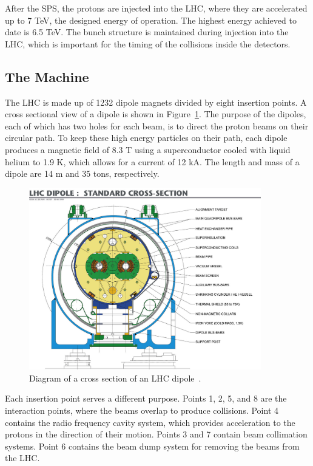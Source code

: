 After the SPS, the protons are injected into the LHC, where they are accelerated up to 7 TeV, the
designed energy of operation. The highest energy achieved to date is 6.5 TeV.
The bunch structure is maintained during injection into the LHC, which is important for the timing
of the collisions inside the detectors. 

\subsection{The Machine\label{subsec:machine}}

The LHC is made up of 1232 dipole magnets divided by eight insertion points. A cross sectional view
of a dipole is shown in Figure~\ref{fig:lhc_dipole}. The purpose of the
dipoles, each of which has two holes for each beam, is to direct the proton beams on their circular
path. To keep these high energy particles on their path, each dipole produces a magnetic field
of 8.3 T using a superconductor cooled with liquid helium to 1.9 K, which allows for a current
of 12 kA. The length and mass of a dipole are 14 m and 35 tons, respectively.

\begin{figure}[htbp!]
 \begin{center}
    \includegraphics[width=0.90\textwidth]{figures/experiment/9906025_01.jpeg}
      \end{center}
\caption{Diagram of a cross section of an LHC dipole~\cite{Team:40524}.}
\label{fig:lhc_dipole}
\end{figure}

Each insertion point serves a different purpose. Points 1, 2, 5, and 8 are the interaction points, where
the beams overlap to produce collisions. Point 4 contains the radio frequency cavity system, which
provides acceleration to the protons in the direction of their motion. Points 3 and 7 contain beam
collimation systems. Point 6 contains the beam dump system for removing the beams from the LHC.

